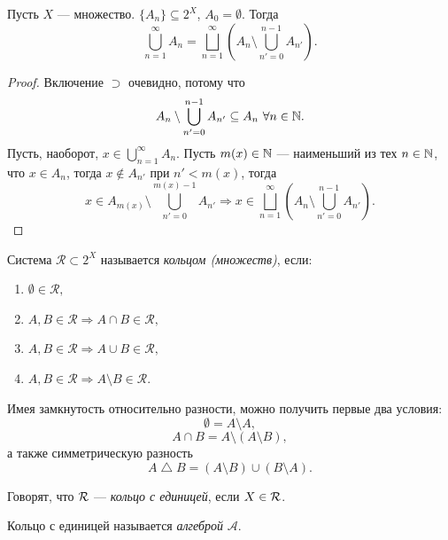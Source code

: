 \begin{lemma}
    Пусть $X$ — множество. $\{A_n\} \subseteq 2^{X}$, $A_0 = \emptyset$. Тогда 
    \[\bigcup\limits_{n=1}^{\infty} A_n = \bigsqcup\limits_{n=1}^{\infty} \left(A_n \setminus \bigcup\limits_{n' = 0}^{n - 1} A_{n'}\right).\]
\end{lemma} 
\begin{proof}
    Включение $\supset$ очевидно, потому что
    \[A_n \setminus \bigcup\limits_{n' = 0}^{n-1} A_{n'} \subseteq A_n \ \forall n \in \mathbb{N}.\]
    Пусть, наоборот, $x \in \bigcup\limits_{n=1}^{\infty} A_n$.
    Пусть $m(x) \in \mathbb{N}$ — наименьший из тех $n \in \mathbb{N}$, что $x \in A_n$, тогда $x \notin A_{n'}$ при $n' < m(x)$, тогда 
    $$x \in A_{m(x)} \setminus \bigcup_{n' = 0}^{m(x) - 1} A_{n'} \Longrightarrow x \in \bigsqcup\limits_{n=1}^\infty \left(A_n \setminus \bigcup\limits_{n' = 0}^{n - 1} A_{n'} \right).$$
\end{proof} 

\begin{definition}
    Система $\mathcal{R} \subset 2^X$ называется \textit{кольцом (множеств)}, если:
    \begin{enumerate}
        \item $\emptyset \in \mathcal{R},$
        \item $A, B \in \mathcal{R} \Longrightarrow A \cap B \in \mathcal{R},$
        \item $A, B \in \mathcal{R} \Longrightarrow A \cup B \in \mathcal{R},$
        \item $A, B \in \mathcal{R} \Longrightarrow A \setminus B \in \mathcal{R}.$
    \end{enumerate}
\end{definition} 

\begin{remark}
    Имея замкнутость относительно разности, можно получить первые два условия:
    \[\emptyset = A \setminus A,\]
    \[A \cap B = A \setminus (A \setminus B),\]
    а также симметрическую разность
    \[A \bigtriangleup B = (A \setminus B) \cup (B \setminus A).\]
\end{remark}

\begin{definition}
    Говорят, что $\mathcal{R}$ — \textit{кольцо с единицей}, если $X \in \mathcal{R}$.
\end{definition} 

\begin{definition}
    Кольцо с единицей называется \textit{алгеброй} $\mathcal{A}$.
\end{definition} 

